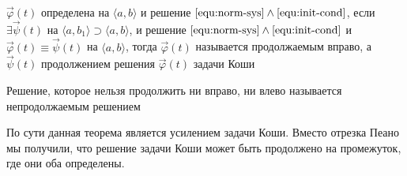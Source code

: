 \begin{definition} 
    $\Vec{\varphi}(t)$ определена на $\langle a, b\rangle$ и решение $\eqref{equ:norm-sys} \wedge \eqref{equ:init-cond}$, если $\exists \Vec{\psi}(t)$ на $\langle a, b_1\rangle \supset \langle a, b\rangle$, и решение $\eqref{equ:norm-sys} \wedge \eqref{equ:init-cond}$ и $\Vec{\varphi}(t) \equiv \Vec{\psi}(t)$ на $\langle a, b\rangle$, тогда $\Vec{\varphi}(t)$ называется продолжаемым вправо, а $\Vec{\psi}(t)$ продолжением решения $\Vec{\varphi}(t)$ задачи Коши
\end{definition}

\begin{definition} 
    Решение, которое нельзя продолжить ни вправо, ни влево называется непродолжаемым решением
\end{definition}

\begin{remark}
    По сути данная теорема является усилением задачи Коши. Вместо отрезка Пеано мы получили, что решение задачи Коши может быть продолжено на промежуток, где они оба определены.
\end{remark}

